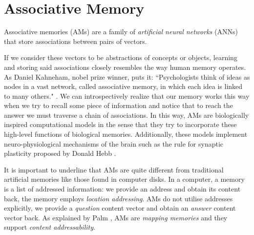 \documentclass[runningheads]{llncs}
\begin{document}
\section{Associative Memory}
\label{sec:assomem}
Associative memories (AMs) are a family of \textit{artificial neural networks} (ANNs) that store associations between pairs of vectors.

If we consider these vectors to be abstractions of concepts or objects, learning and storing said associations closely resembles the way human memory operates. As Daniel Kahneham, nobel prize winner, puts it: ``Psychologists think of ideas as nodes in a vast network, called associative memory, in which each idea is linked to many others." \cite{daniel2017thinking}.  We can introspectively realize that our memory works this way when we try to recall some piece of information and notice that to reach the answer we must traverse a chain of associations. In this way, AMs are biologically inspired computational models in the sense that they try to incorporate these high-level functions of biological memories. Additionally, these models implement neuro-physiological mechanisms of the brain such as the rule for synaptic plasticity proposed by Donald Hebb \cite{hebb2005organization}.

It is important to underline that AMs are quite different from traditional artificial memories like those found in computer disks. In a computer, a memory is a list of addressed information: we provide an address and obtain its content back, the memory employs \textit{location addressing}. AMs do not utilise addresses explicitly, we provide a \textit{question} content vector and obtain an \textit{answer} content vector back.  As explained by Palm \cite{PALM1982145}, AMs are \textit{mapping memories} and they support \textit{content addressability}.
\end{document}
